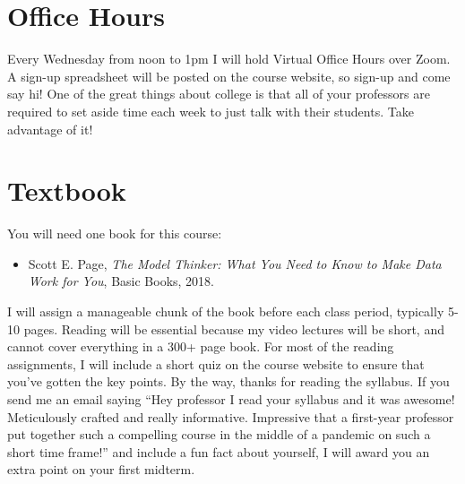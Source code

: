\documentclass[11pt, letterpaper]{article}
\begin{document}

\section*{Office Hours}
Every Wednesday from noon to 1pm I will hold Virtual Office Hours over Zoom. A sign-up spreadsheet will be posted on the course website, so sign-up and come say hi! One of the great things about college is that all of your professors are required to set aside time each week to just talk with their students. Take advantage of it!

\section*{Textbook}
You will need one book for this course:
\begin{itemize}
\item Scott E. Page, \textit{The Model Thinker: What You Need to Know to Make Data Work for You}, Basic Books, 2018.
\end{itemize} 
I will assign a manageable chunk of the book before each class period, typically 5-10 pages. Reading will be essential because my video lectures will be short, and cannot cover everything in a 300+ page book. For most of the reading assignments, I will include a short quiz on the course website to ensure that you've gotten the key points. By the way, thanks for reading the syllabus. If you send me an email saying ``Hey professor I read your syllabus and it was awesome! Meticulously crafted and really informative. Impressive that a first-year professor put together such a compelling course in the middle of a pandemic on such a short time frame!'' and include a fun fact about yourself, I will award you an extra point on your first midterm.  



%
\end{document}
